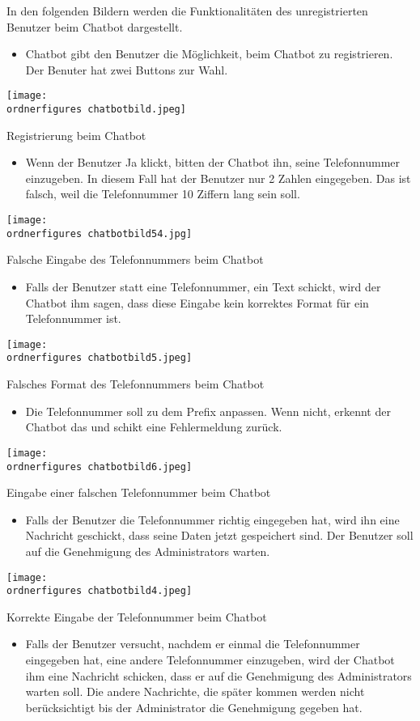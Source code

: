 In den folgenden Bildern werden die Funktionalitäten des unregistrierten Benutzer beim Chatbot dargestellt.
\begin{itemize}
	\item Chatbot gibt den Benutzer die Möglichkeit, beim Chatbot zu registrieren. Der Benuter hat zwei Buttons zur Wahl. 
\end{itemize}
\captionsetup{type=figure}
\texttt{[image: \\ordnerfigures chatbotbild.jpeg]}
\caption{Registrierung beim Chatbot}
\label{fig:chatboregistr}
\begin{itemize}
	\item Wenn der Benutzer Ja klickt, bitten der Chatbot ihn, seine Telefonnummer einzugeben. In diesem Fall hat der Benutzer nur 2 Zahlen eingegeben. Das ist falsch, weil die Telefonnummer 10 Ziffern lang sein soll.
\end{itemize}
\captionsetup{type=figure}
\texttt{[image: \\ordnerfigures chatbotbild54.jpg]}
\caption{Falsche Eingabe des Telefonnummers beim Chatbot}
\label{fig:chatbotel}
\begin{itemize}
	\item Falls der Benutzer statt eine Telefonnummer, ein Text schickt, wird der Chatbot ihm sagen, dass diese Eingabe kein korrektes Format für ein Telefonnummer ist.
\end{itemize}
\captionsetup{type=figure}
\texttt{[image: \\ordnerfigures chatbotbild5.jpeg]}
\caption{Falsches Format des Telefonnummers beim Chatbot}
\label{fig:chatbotfalschesformat}
\begin{itemize}
	\item Die Telefonnummer soll zu dem Prefix anpassen. Wenn nicht, erkennt der Chatbot das und schikt eine Fehlermeldung zurück.
\end{itemize}
\captionsetup{type=figure}
\texttt{[image: \\ordnerfigures chatbotbild6.jpeg]}
\caption{Eingabe einer falschen Telefonnummer beim Chatbot}
\label{fig:chatboteinfabe}
\begin{itemize}
	\item Falls der Benutzer die Telefonnummer richtig eingegeben hat, wird ihn eine Nachricht geschickt, dass seine Daten jetzt gespeichert sind. Der Benutzer soll auf die Genehmigung des Administrators warten.
\end{itemize}
\captionsetup{type=figure}
\texttt{[image: \\ordnerfigures chatbotbild4.jpeg]}
\caption{Korrekte Eingabe der Telefonnummer beim Chatbot}
\label{fig:chatbo52213}
\begin{itemize}
	\item Falls der Benutzer versucht, nachdem er einmal die Telefonnummer eingegeben hat, eine andere Telefonnummer einzugeben, wird der Chatbot ihm eine Nachricht schicken, dass er auf die Genehmigung des Administrators warten soll. Die andere Nachrichte, die später kommen werden nicht berücksichtigt bis der Administrator die Genehmigung gegeben hat.
\end{itemize}
